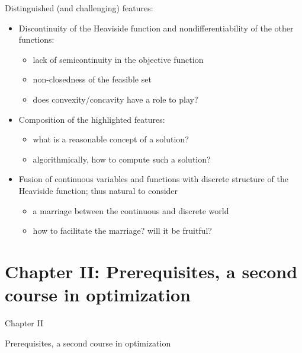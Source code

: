 \documentclass[aspectratio=169,xcolor=dvipsnames]{beamer}
\begin{document}
\begin{frame}{Distinguished (and challenging) features:}
  \small
  \setlength{\parskip}{0pt}
  \begin{itemize}
    \setlength{\itemsep}{0.14cm}
    \item \textcolor{MediumRed}{Discontinuity} of the Heaviside function and
      \textcolor{MediumRed}{nondifferentiability} of the other functions:
      \begin{itemize}
        \setlength{\itemsep}{0.04cm}
        \item[---] lack of semicontinuity in the objective function
        \item[---] non-closedness of the feasible set
        \item[---] does convexity/concavity have a role to play?
      \end{itemize}

    \item \textcolor{MediumRed}{Composition} of the highlighted features:
      \begin{itemize}
        \setlength{\itemsep}{0.04cm}
        \item[---] what is a reasonable concept of a
          \textcolor{MediumRed}{solution}?
        \item[---] algorithmically, how to compute such a solution?
      \end{itemize}

    \item \textcolor{MediumRed}{Fusion} of continuous variables and functions
      with discrete structure of the Heaviside function; thus natural to
      consider
      \begin{itemize}
        \setlength{\itemsep}{0.04cm}
        \item[---] a \textcolor{MediumRed}{marriage} between the continuous
          and discrete world
        \item[---] how to facilitate the marriage? will it be fruitful?
      \end{itemize}
  \end{itemize}
\end{frame}

\section{Chapter II: Prerequisites, a second course in optimization}

\begin{frame}[plain]
  \hypertarget{chapter-prerequisites}{}
  \centering
  \vfill
  {Chapter II\par}
  \vspace{0.34cm}
  {\mdseries\large
    Prerequisites, a second course in optimization\par}
  \vfill
\end{frame}
\end{document}
